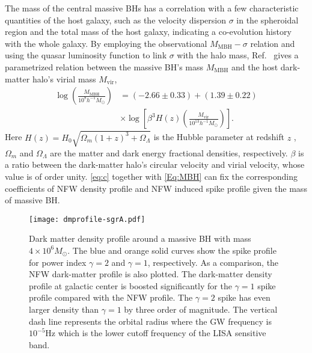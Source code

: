 The mass of the central massive \acp{BH} has a correlation with a few characteristic quantities of the host galaxy, such as the velocity dispersion $\sigma$ in the spheroidal region and the total mass of the host galaxy, indicating a co-evolution history with the whole galaxy. 
By employing the observational $M_\textrm{MBH}-\sigma$ relation and using  the quasar luminosity function to link $\sigma$ with the halo mass, Ref.~\cite{Croton:2009zx} gives a parametrized relation between the massive \ac{BH}'s mass $M_\textrm{MBH}$ and the host dark-matter halo's virial mass $M_\text{vir}$,
\begin{align}
\log \left( \frac{M_\text{MBH}}{10^8 h^{-1} M_\odot}\right) &= (-2.66\pm 0.33) +(1.39 \pm  0.22) \nonumber \\
 &\times \log 	\left[  \beta^3  H(z) \left( \frac{M_\text{vir}}{10^{13} h^{-1} M_\odot }\right)\right].
 \label{Eq:MBH}
\end{align}
Here $H(z)=H_0 \sqrt{\Omega_m(1+z)^3+\Omega_\Lambda}$ is the Hubble parameter at redshift $z$ , $\Omega_m$ and $\Omega_\Lambda$ are the matter and dark energy fractional densities, respectively. $\beta$ is a ratio between the dark-matter halo's circular velocity and virial velocity, whose value is of order unity.
\cref{eq:c} together with \cref{Eq:MBH} can fix the corresponding coefficients of NFW density profile and NFW induced spike profile given the mass of massive \ac{BH}.
 
  \begin{figure}[htbp] %
   \centering
   \texttt{[image: dmprofile-sgrA.pdf]} 
   \caption{Dark matter density profile around a massive \ac{BH} with mass $4\times 10^6 M_\odot$. The blue and orange solid curves show the spike profile for power index $\gamma = 2$ and $\gamma=1$, respectively. 
 As a comparison, the NFW dark-matter profile is also plotted.
The dark-matter density profile at galactic center is  boosted significantly for the $\gamma=1$ spike profile compared with the NFW profile. 
The $\gamma=2$ spike has even larger density than $\gamma=1$ by three order of magnitude.
The vertical dash line represents the orbital radius where the \ac{GW} frequency is $10^{-5} $Hz which is the lower cutoff frequency of the LISA sensitive band.
}
   \label{fig:profile}
\end{figure}

